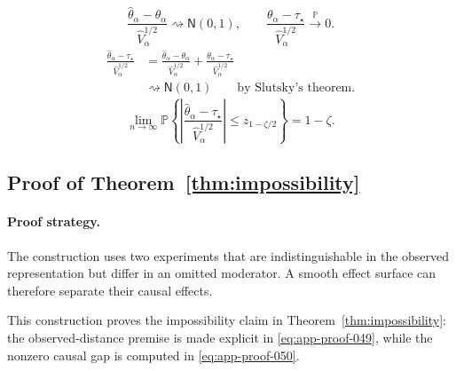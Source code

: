 \documentclass[11pt]{article}
\numberwithin{equation}{section}
\newcommand{\Pbb}{\mathbb P}
\newcommand{\1}{\mathbf 1}
\newcommand{\abs}[1]{\left\lvert #1\right\rvert}
\newcommand{\Normal}{\mathsf N}
\begin{document}
\begin{equation}
\label{eq:app-proof-045}
\frac{\widehat\theta_\alpha-\theta_\alpha}
{\widehat V_\alpha^{1/2}}\rightsquigarrow\Normal(0,1),
\qquad
\frac{\theta_\alpha-\tau_\star}
{\widehat V_\alpha^{1/2}}\xrightarrow{\Pbb}0.
\end{equation}
\begin{equation}
\label{eq:app-proof-046}
\begin{aligned}
\frac{\widehat\theta_\alpha-\tau_\star}
{\widehat V_\alpha^{1/2}}
&=\frac{\widehat\theta_\alpha-\theta_\alpha}
{\widehat V_\alpha^{1/2}}
+\frac{\theta_\alpha-\tau_\star}
{\widehat V_\alpha^{1/2}}\\
&\rightsquigarrow\Normal(0,1)
\qquad\text{by Slutsky's theorem}.
\end{aligned}
\end{equation}
\begin{equation}
\label{eq:app-proof-047}
\lim_{n\to\infty}
\Pbb\!\left\{
\abs{\frac{\widehat\theta_\alpha-\tau_\star}
{\widehat V_\alpha^{1/2}}}
\le z_{1-\zeta/2}
\right\}
=1-\zeta.
\end{equation}
\subsection{Proof of Theorem~\ref{thm:impossibility}}
\label{app:proof-thm-impossibility}

\paragraph{Proof strategy.} The construction uses two experiments that are indistinguishable in the observed representation but differ in an omitted moderator.  A smooth effect surface can therefore separate their causal effects.

This construction proves the impossibility claim in Theorem~\ref{thm:impossibility}:
the observed-distance premise is made explicit in
\eqref{eq:app-proof-049}, while the nonzero causal gap is computed in
\eqref{eq:app-proof-050}.
\end{document}
